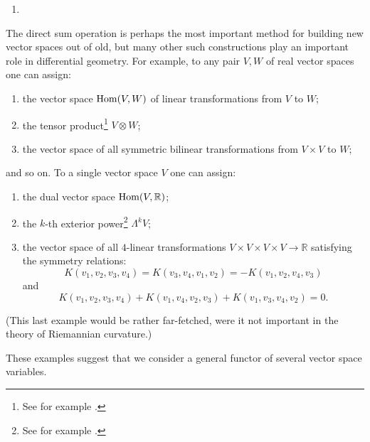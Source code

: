 \documentclass[../main]{subfiles}
\begin{document}
\begin{enumerate}
    \item[(f)] 
\end{enumerate}
The direct sum operation is perhaps the most important method for building new vector spaces out of old, but many other such constructions play an important role in differential geometry. For example, to any pair $V, W$ of real vector spaces one can assign:

\begin{enumerate}\label{functors on vectors}
	\item[1)] the vector space $\operatorname{Hom}(V, W)$ of linear transformations from $V$ to  $W$;
	\item[2)] the tensor product\footnote{See for example \cite[pp. 408]{lang1965algebra}.} $V\otimes W$;
	\item[3)] the vector space of all symmetric bilinear transformations from $V \times V$ to $W$;
\end{enumerate}

and so on. To a single vector space $V$ one can assign:

\begin{enumerate} 
	\item[4)] the dual vector space $\operatorname{Hom}(V, \mathbb R) $; 
	\item[5)] the $k$-th exterior power\footnote{See for example \cite[pp. 424]{lang1965algebra}.} $\Lambda^k V$;
	\item[6)] the vector space of all $4$-linear transformations
	$V \times V\times V \times V\to \mathbb{R}$ satisfying the symmetry relations:
	\[
	K(v_1,v_2,v_3,v_4)=K(v_3,v_4,v_1,v_2)=-K(v_1,v_2,v_4,v_3)
	\]
	and
	\[
	K(v_1,v_2,v_3,v_4)+K(v_1,v_4,v_2,v_3)+K(v_1,v_3,v_4,v_2)=0.
	\]
\end{enumerate}

(This last example would be rather far-fetched, were it not important in the theory of Riemannian curvature.)

These examples suggest that we consider a general functor of several vector space variables.
\end{document}
